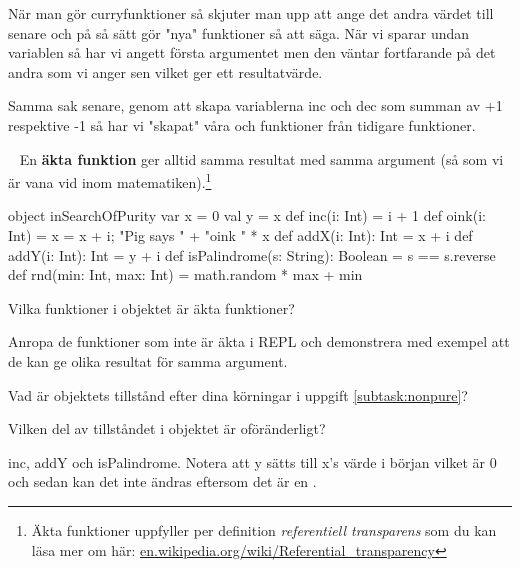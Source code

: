 \SOLUTION


\TaskSolved \what
 När man gör curryfunktioner så skjuter man upp att ange det andra värdet till senare och på så sätt gör "nya" funktioner så att säga. När vi sparar undan variablen  så har vi angett första argumentet men den väntar fortfarande på det andra som vi anger sen vilket ger ett resultatvärde.

Samma sak senare, genom att skapa variablerna inc och dec som summan av +1 respektive -1 så har vi "skapat" våra  och  funktioner från tidigare funktioner.



\QUESTEND


\QUESTBEGIN

\Task  \what~  En \textbf{äkta funktion} ger alltid samma resultat med samma argument  (så som vi är vana vid inom matematiken).\footnote{Äkta funktioner uppfyller per definition  \textit{referentiell transparens}  som du kan läsa mer om här:  \href{https://en.wikipedia.org/wiki/Referential_transparency}{en.wikipedia.org/wiki/Referential\_transparency}}

\begin{Code}
object inSearchOfPurity {
  var x = 0
  val y = x
  def inc(i: Int) = i + 1
  def oink(i: Int) = {x = x + i; "Pig says " + "oink " * x}
  def addX(i: Int): Int = x + i
  def addY(i: Int): Int = y + i
  def isPalindrome(s: String): Boolean = s == s.reverse
  def rnd(min: Int, max: Int) = math.random * max + min
}
\end{Code}

\Subtask Vilka funktioner i objektet  är äkta funktioner?

\Subtask \label{subtask:nonpure} Anropa de funktioner som inte är äkta i REPL och demonstrera med exempel att de kan ge olika resultat för samma argument.

\Subtask Vad är objektets tillstånd efter dina körningar i uppgift \ref{subtask:nonpure}?

\Subtask Vilken del av tillståndet i objektet är oföränderligt?



\SOLUTION


\TaskSolved \what


\SubtaskSolved  inc, addY och isPalindrome. Notera att y sätts till x's värde i början vilket är 0 och sedan kan det inte ändras eftersom det är en .

